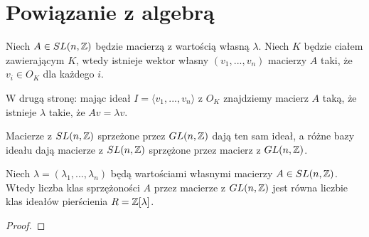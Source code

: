 \documentclass[a4paper, 12pt]{article}
\begin{document}
\section{Powiązanie z algebrą}

\begin{lemma}
  Niech $A\in SL(n,\mathbb{Z})$ będzie macierzą z wartością własną $\lambda$. Niech $K$ będzie ciałem zawierającym $K$, wtedy istnieje wektor własny $(v_1,...,v_n)$ macierzy $A$ taki, że $v_i\in O_K$ dla każdego $i$.
\end{lemma}

\begin{lemma}
  W drugą stronę: mając ideał $I=\langle v_1,...,v_n\rangle$ z $O_K$ znajdziemy macierz $A$ taką, że istnieje $\lambda$ takie, że $Av=\lambda v$. 
\end{lemma}

\begin{lemma}\color{blue}
  Macierze z $SL(n,\mathbb{Z})$ sprzeżone przez $GL(n,\mathbb{Z})$ dają ten sam ideał, a różne bazy ideału dają macierze z $SL(n,\mathbb{Z})$ sprzężone przez macierz z $GL(n,\mathbb{Z})$.
\end{lemma}

\begin{theorem}
  Niech $\lambda=(\lambda_1,...,\lambda_n)$ będą wartościami własnymi macierzy $A\in SL(n, \mathbb{Z})$. Wtedy liczba klas sprzężoności $A$ przez macierze z $GL(n,\mathbb{Z})$ jest równa liczbie klas ideałów pierścienia $R=\mathbb{Z}[\lambda]$.
\end{theorem}

\begin{proof}

\end{proof}


%
%
%
%
%
%
\end{document}
